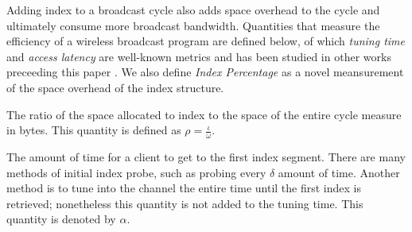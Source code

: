
Adding index to a broadcast cycle also adds space overhead to the
cycle and ultimately consume more broadcast bandwidth. Quantities
that measure the efficiency of a wireless broadcast program are
defined below, of which \emph{tuning time} and \emph{access
latency} are well-known metrics and has been studied in other
works preceeding this paper \cite{dsi} \cite{data_on_air}
\cite{DBLP:journals/tmc/KuZW08} \cite{signature_and_caching}. We
also define \emph{Index Percentage} as a novel meansurement of the
space overhead of the index structure.

\begin{definition}\label{def:index_percentage}
The ratio of the space allocated to index to the space of the
entire cycle measure in bytes. This quantity is defined as $\rho =
\frac{\iota}{\omega}$.
\end{definition}

\begin{definition}\label{def:index_probe}
The amount of time for a client to get to the first index segment.
There are many methods of initial index probe, such as probing
every $\delta$ amount of time. Another method is to tune into the
channel the entire time until the first index is retrieved;
nonetheless this quantity is not added to the tuning time. This
quantity is denoted by $\alpha$.
\end{definition}

